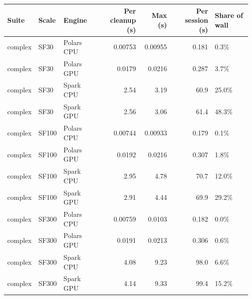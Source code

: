 \begin{tabular}{lllrrrl}
\toprule
Suite & Scale & Engine & Per cleanup (s) & Max (s) & Per session (s) & Share of wall \\
\midrule
complex & SF30 & Polars CPU & 0.00753 & 0.00955 & 0.181 & 0.3\% \\
complex & SF30 & Polars GPU & 0.0179 & 0.0216 & 0.287 & 3.7\% \\
complex & SF30 & Spark CPU & 2.54 & 3.19 & 60.9 & 25.0\% \\
complex & SF30 & Spark GPU & 2.56 & 3.06 & 61.4 & 48.3\% \\
complex & SF100 & Polars CPU & 0.00744 & 0.00933 & 0.179 & 0.1\% \\
complex & SF100 & Polars GPU & 0.0192 & 0.0216 & 0.307 & 1.8\% \\
complex & SF100 & Spark CPU & 2.95 & 4.78 & 70.7 & 12.0\% \\
complex & SF100 & Spark GPU & 2.91 & 4.44 & 69.9 & 29.2\% \\
complex & SF300 & Polars CPU & 0.00759 & 0.0103 & 0.182 & 0.0\% \\
complex & SF300 & Polars GPU & 0.0191 & 0.0213 & 0.306 & 0.6\% \\
complex & SF300 & Spark CPU & 4.08 & 9.23 & 98.0 & 6.6\% \\
complex & SF300 & Spark GPU & 4.14 & 9.33 & 99.4 & 15.2\% \\
\bottomrule
\end{tabular}

